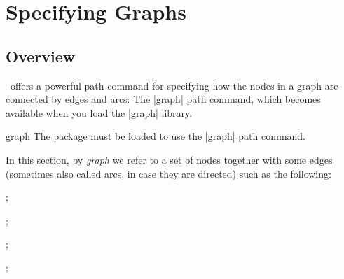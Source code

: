 %
%
%


\section{Specifying Graphs}
\label{section-library-graphs}

\subsection{Overview}

\tikzname\ offers a powerful path command for specifying how the nodes
in a graph are connected by edges and arcs: The |graph| path
command, which becomes available when you load the |graph| library.

\begin{tikzlibrary}{graph}
  The package must be loaded to use the |graph| path command.
\end{tikzlibrary}


In this section, by \emph{graph} we refer to a set of nodes together
with some edges (sometimes also called arcs, in case they are
directed) such as the following:

\begin{codeexample}[]
\tikz {};  
\end{codeexample}

\begin{codeexample}[]
\tikz {};
\end{codeexample}

\begin{codeexample}[]
\tikz
  ;
\end{codeexample}

\begin{codeexample}[]
\tikz
  ;
\end{codeexample}

